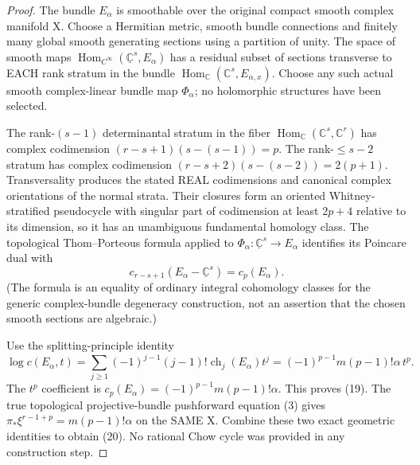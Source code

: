 \documentclass[11pt]{article}
\begin{document}
\begin{proof}
The bundle $E_\alpha$ is smoothable
over the original compact smooth
complex manifold X. Choose a
Hermitian metric, smooth bundle
connections and finitely many
global smooth generating sections
using a partition of unity.
The space of smooth maps
$\operatorname{Hom}_{C^\infty}
(\underline{\mathbb C}^s,E_\alpha)$
has a residual subset of sections
transverse to EACH rank stratum in
the bundle
$\operatorname{Hom}_\mathbb C
(\mathbb C^s,E_{\alpha,x})$.
Choose any such actual smooth
complex-linear bundle map
$\Phi_\alpha$; no holomorphic
structures have been selected.

The rank-$(s-1)$ determinantal
stratum in the fiber
$\operatorname{Hom}_\mathbb C
(\mathbb C^s,\mathbb C^r)$ has
complex codimension
$(r-s+1)(s-(s-1))=p$.
The rank-$\le s-2$ stratum has
complex codimension
$(r-s+2)(s-(s-2))=2(p+1)$.
Transversality produces the
stated REAL codimensions and
canonical complex orientations
of the normal strata. Their
closures form an oriented
Whitney-stratified
pseudocycle with singular
part of codimension at least
$2p+4$ relative to its
dimension, so it has an
unambiguous fundamental
homology class. The
topological Thom--Porteous
formula applied to
$\Phi_\alpha:
\underline{\mathbb C}^s\to E_\alpha$
identifies its Poincare dual with
\[
 c_{r-s+1}
     (E_\alpha-\underline{\mathbb C}^s)
       =c_p(E_\alpha).
\]
(The formula is an equality
of ordinary integral
cohomology classes for the
generic complex-bundle
degeneracy construction,
not an assertion that the
chosen smooth sections
are algebraic.)

Use the splitting-principle
identity
\[
 \log c(E_\alpha,t)
   =\sum_{j\ge1}
     (-1)^{j-1}(j-1)!
         \operatorname{ch}_j(E_\alpha)t^j
   =(-1)^{p-1}m(p-1)!\alpha\,t^p .
\]
The $t^p$ coefficient is
$c_p(E_\alpha)=
(-1)^{p-1}m(p-1)!\alpha$.
This proves (19). The true
topological projective-bundle
pushforward equation (3) gives
$\pi_*\xi^{r-1+p}
=m(p-1)!\alpha$ on the SAME X.
Combine these two exact geometric
identities to obtain (20).
No rational Chow cycle was
provided in any construction
step.
\end{proof}
\end{document}
